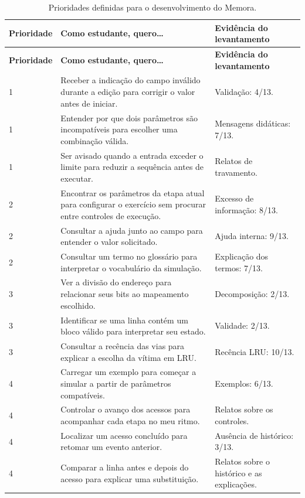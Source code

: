 \begingroup\small
\begin{longtable}{@{}P{1.75cm}P{8cm}P{4.3cm}@{}}
\caption{Prioridades definidas para o desenvolvimento do Memora.}\label{tab:escopo-memora}\\
\toprule\textbf{Prioridade} & \textbf{Como estudante, quero\ldots} & \textbf{Evidência do levantamento}\\\midrule\endfirsthead
\toprule\textbf{Prioridade} & \textbf{Como estudante, quero\ldots} & \textbf{Evidência do levantamento}\\\midrule{} & Receber a indicação do campo inválido durante a edição para corrigir o valor antes de iniciar. & Validação: 4/13.\\
1 & Entender por que dois parâmetros são incompatíveis para escolher uma combinação válida. & Mensagens didáticas: 7/13.\\
1 & Ser avisado quando a entrada exceder o limite para reduzir a sequência antes de executar. & Relatos de travamento.\\
2 & Encontrar os parâmetros da etapa atual para configurar o exercício sem procurar entre controles de execução. & Excesso de informação: 8/13.\\
2 & Consultar a ajuda junto ao campo para entender o valor solicitado. & Ajuda interna: 9/13.\\
2 & Consultar um termo no glossário para interpretar o vocabulário da simulação. & Explicação dos termos: 7/13.\\
3 & Ver a divisão do endereço para relacionar seus bits ao mapeamento escolhido. & Decomposição: 2/13.\\
3 & Identificar se uma linha contém um bloco válido para interpretar seu estado. & Validade: 2/13.\\
3 & Consultar a recência das vias para explicar a escolha da vítima em LRU. & Recência LRU: 10/13.\\
4 & Carregar um exemplo para começar a simular a partir de parâmetros compatíveis. & Exemplos: 6/13.\\
4 & Controlar o avanço dos acessos para acompanhar cada etapa no meu ritmo. & Relatos sobre os controles.\\
4 & Localizar um acesso concluído para retomar um evento anterior. & Ausência de histórico: 3/13.\\
4 & Comparar a linha antes e depois do acesso para explicar uma substituição. & Relatos sobre o histórico e as explicações.\\
\bottomrule
\end{longtable}
\endgroup

